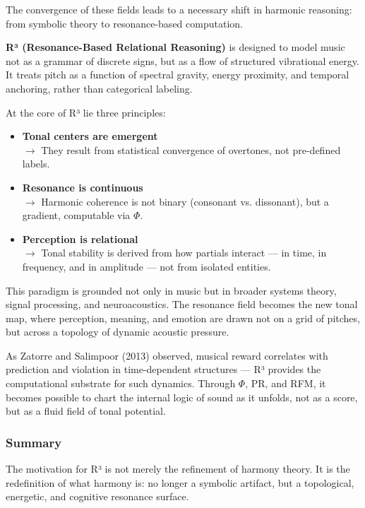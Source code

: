 The convergence of these fields leads to a necessary shift in harmonic reasoning: from symbolic theory to resonance-based computation.

\textbf{R³ (Resonance-Based Relational Reasoning)} is designed to model music not as a grammar of discrete signs, but as a flow of structured vibrational energy. It treats pitch as a function of spectral gravity, energy proximity, and temporal anchoring, rather than categorical labeling.

At the core of R³ lie three principles:

\begin{itemize}
    \item \textbf{Tonal centers are emergent}\\
    $\rightarrow$ They result from statistical convergence of overtones, not pre-defined labels.
    
    \item \textbf{Resonance is continuous}\\
    $\rightarrow$ Harmonic coherence is not binary (consonant vs. dissonant), but a gradient, computable via $\Phi$.
    
    \item \textbf{Perception is relational}\\
    $\rightarrow$ Tonal stability is derived from how partials interact — in time, in frequency, and in amplitude — not from isolated entities.
\end{itemize}

This paradigm is grounded not only in music but in broader systems theory, signal processing, and neuroacoustics. The resonance field becomes the new tonal map, where perception, meaning, and emotion are drawn not on a grid of pitches, but across a topology of dynamic acoustic pressure.

As Zatorre and Salimpoor (2013) observed, musical reward correlates with prediction and violation in time-dependent structures — R³ provides the computational substrate for such dynamics. Through $\Phi$, PR, and RFM, it becomes possible to chart the internal logic of sound as it unfolds, not as a score, but as a fluid field of tonal potential.

\subsubsection*{Summary}

The motivation for R³ is not merely the refinement of harmony theory. It is the redefinition of what harmony is: no longer a symbolic artifact, but a topological, energetic, and cognitive resonance surface.

